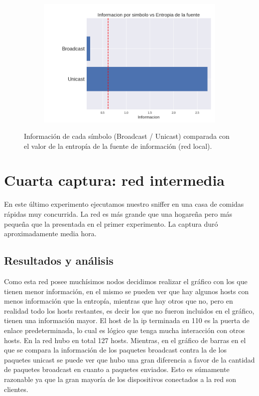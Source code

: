 \begin{figure}[h]
  \begin{subfigure}{.5\textwidth}
    \includegraphics[width=\textwidth]{imagenes/mini_red/mini_red_unicastvsbroadcast.png}
  \end{subfigure}
  \label{fig:exp3_univsbr_infovsentro}
  \caption{Información de cada símbolo (Broadcast / Unicast) comparada con el valor de la entropía de la fuente de información (red local).}
\end{figure}


\section{Cuarta captura: red intermedia}
En este último experimento ejecutamos nuestro sniffer en una casa de comidas rápidas muy concurrida. La red es más grande que una hogareña pero más pequeña que la presentada en el primer experimento. La captura duró aproximadamente media hora.

\subsection{Resultados y análisis}
Como esta red posee muchísimos nodos decidimos realizar el gráfico con los que tienen menor información, en el mismo se pueden ver que hay algunos hosts con menos información que la entropía, mientras que hay otros que no, pero en realidad todo los hosts restantes, es decir los que no fueron incluidos en el gráfico, tienen una información mayor. El host de la ip terminada en 110 es la puerta de enlace predeterminada, lo cual es lógico que tenga mucha interacción con otros hosts. En la red hubo en total 127 hosts. Mientras, en el gráfico de barras en el que se compara la información de los paquetes broadcast contra la de los paquetes unicast se puede ver que hubo una gran diferencia a favor de la cantidad de paquetes broadcast en cuanto a paquetes enviados. Esto es súmamente razonable ya que la gran mayoría de los dispositivos conectados a la red son clientes.

